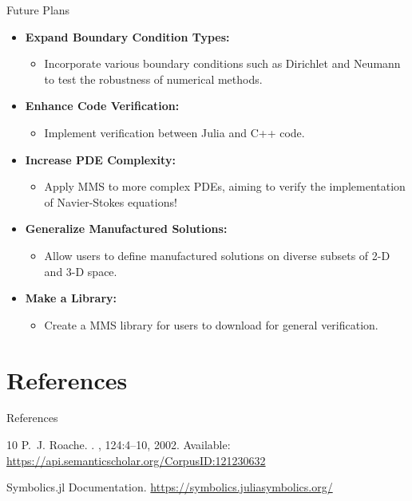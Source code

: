 \documentclass{beamer}
\begin{document}
\begin{frame}{Future Plans}
    \begin{itemize}
        \item \textbf{Expand Boundary Condition Types:}
            \begin{itemize}
                \item Incorporate various boundary conditions such as Dirichlet and Neumann to test the robustness of numerical methods.
            \end{itemize}
        \item \textbf{Enhance Code Verification:}
        \begin{itemize}
            \item Implement verification between Julia and C++ code.
        \end{itemize}
        \item \textbf{Increase PDE Complexity:}
            \begin{itemize}
                \item Apply MMS to more complex PDEs, aiming to verify the implementation of Navier-Stokes equations!
            \end{itemize}
        \item \textbf{Generalize Manufactured Solutions:}
            \begin{itemize}
                \item Allow users to define manufactured solutions on diverse subsets of 2-D and 3-D space.
            \end{itemize}
        \item \textbf{Make a Library:}
        \begin{itemize}
            \item Create a MMS library for users to download for general verification.
        \end{itemize}
    \end{itemize}
\end{frame}



\section{References}

\begin{frame}[allowframebreaks]{References}
    
    \begin{thebibliography}{10}
        \beamertemplatearticlebibitems
        P.~J. Roache.
        .
        , 124:4--10, 2002.
        \newblock Available: \url{https://api.semanticscholar.org/CorpusID:121230632}
        
        \beamertemplatearticlebibitems
        Symbolics.jl Documentation.
        \newblock \url{https://symbolics.juliasymbolics.org/}


    \end{thebibliography}
\end{frame}
\end{document}
